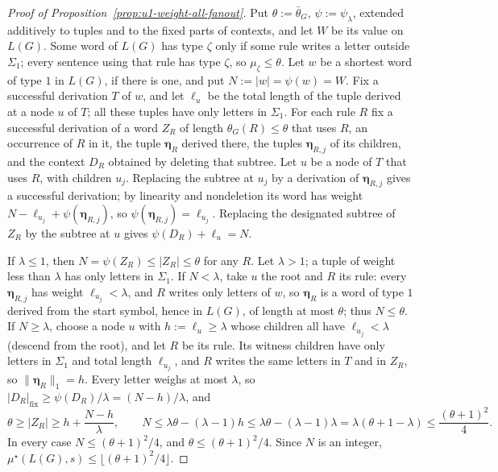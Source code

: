\documentclass[11pt]{article}
\numberwithin{equation}{section}
\theoremstyle{plain}
\theoremstyle{definition}
\theoremstyle{remark}
\theoremstyle{plain}
\begin{document}
\begin{proof}[Proof of Proposition~\ref{prop:u1-weight-all-fanout}]
Put $\theta:=\bar\theta_G$, $\psi:=\psi_\lambda$, extended additively to tuples and
to the fixed parts of contexts, and let $W$ be its value on $L(G)$.  Some word of
$L(G)$ has type $\zeta$ only if some rule writes a letter outside $\Sigma_1$;
every sentence using that rule has type $\zeta$, so $\mu_\zeta\le\theta$.  Let
$w$ be a shortest word of type $1$ in $L(G)$, if there is one, and put
$N:=|w|=\psi(w)=W$.  Fix a successful derivation $T$ of $w$, and let $\ell_u$ be
the total length of the tuple derived at a node $u$ of $T$; all these tuples have
only letters in $\Sigma_1$.  For each rule $R$ fix a successful derivation of a
word $Z_R$ of length $\theta_G(R)\le\theta$ that uses $R$, an occurrence of $R$
in it, the tuple $\boldsymbol\eta_R$ derived there, the tuples
$\boldsymbol\eta_{R,j}$ of its children, and the context $D_R$ obtained by
deleting that subtree.  Let $u$ be a node of $T$ that uses $R$, with children
$u_j$.  Replacing the subtree at $u_j$ by a derivation of $\boldsymbol\eta_{R,j}$
gives a successful derivation; by linearity and nondeletion its word has weight
$N-\ell_{u_j}+\psi(\boldsymbol\eta_{R,j})$, so
$\psi(\boldsymbol\eta_{R,j})=\ell_{u_j}$.  Replacing the designated subtree of
$Z_R$ by the subtree at $u$ gives $\psi(D_R)+\ell_u=N$.

If $\lambda\le1$, then $N=\psi(Z_R)\le|Z_R|\le\theta$ for any $R$.  Let $\lambda>1$;
a tuple of weight less than $\lambda$ has only letters in $\Sigma_1$.  If
$N<\lambda$, take $u$ the root and $R$ its rule: every $\boldsymbol\eta_{R,j}$ has
weight $\ell_{u_j}<\lambda$, and $R$ writes only letters of $w$, so
$\boldsymbol\eta_R$ is a word of type $1$ derived from the start symbol, hence in
$L(G)$, of length at most $\theta$; thus $N\le\theta$.  If $N\ge\lambda$, choose a
node $u$ with $h:=\ell_u\ge\lambda$ whose children all have $\ell_{u_j}<\lambda$
(descend from the root), and let $R$ be its rule.  Its witness children have only
letters in $\Sigma_1$ and total length $\ell_{u_j}$, and $R$ writes the same
letters in $T$ and in $Z_R$, so $\|\boldsymbol\eta_R\|_1=h$.  Every letter weighs
at most $\lambda$, so $|D_R|_{\mathrm{fix}}\ge\psi(D_R)/\lambda=(N-h)/\lambda$, and
\[
 \theta\ge|Z_R|\ge h+\frac{N-h}{\lambda},\qquad
 N\le\lambda\theta-(\lambda-1)h\le\lambda\theta-(\lambda-1)\lambda
 =\lambda(\theta+1-\lambda)\le\frac{(\theta+1)^2}{4}.
\]
In every case $N\le(\theta+1)^2/4$, and $\theta\le(\theta+1)^2/4$.  Since $N$ is an
integer, $\mu^\star(L(G),s)\le\lfloor(\theta+1)^2/4\rfloor$.
\end{proof}
\end{document}
